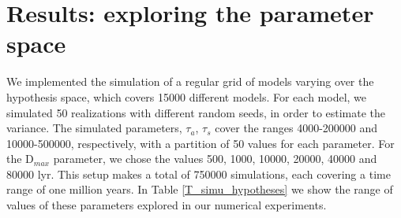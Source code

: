 \section{Results: exploring the parameter space}\label{S_results}

We implemented the simulation of a regular grid of models varying over
the hypothesis space, which covers 15000 different models.
%
For each model, we simulated 50 realizations with different random
seeds, in order to estimate the variance.
%
The simulated parameters, $\tau_a$, $\tau_s$ cover the ranges
4000-200000 and 10000-500000, respectively, with a partition of 50
values for each parameter.
%
For the D$_{max}$ parameter, we chose the values 500, 1000, 10000,
20000, 40000 and 80000 lyr.
%
This setup makes a total of 750000 simulations, each covering a time
range of one million years.
%
In Table \ref{T_simu_hypotheses} we show the range of values of these parameters explored 
in our numerical experiments.


